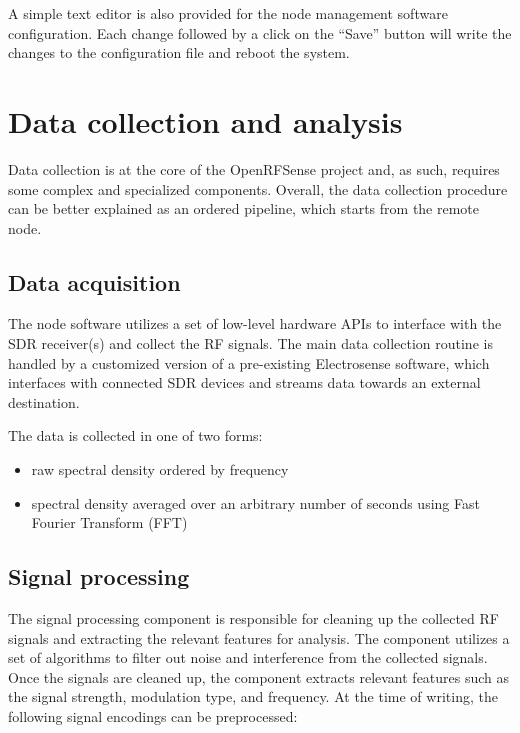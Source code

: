 \documentclass[
  letterpaper,
  a4paper,
  12pt,
  titlepage,
  oneside,
  openany]{book}
\providecommand{\tightlist}{%
  \setlength{\itemsep}{0pt}\setlength{\parskip}{0pt}}\usepackage{longtable,booktabs,array}
\begin{document}
A simple text editor is also provided for the node management software
configuration. Each change followed by a click on the \enquote{Save}
button will write the changes to the configuration file and reboot the
system.

\newpage{}


\hypertarget{data-collection-and-analysis}{%
\chapter{Data collection and
analysis}\label{data-collection-and-analysis}}

Data collection is at the core of the OpenRFSense project and, as such,
requires some complex and specialized components. Overall, the data
collection procedure can be better explained as an ordered pipeline,
which starts from the remote node.

\hypertarget{data-acquisition}{%
\section{Data acquisition}\label{data-acquisition}}

The node software utilizes a set of low-level hardware APIs to interface
with the SDR receiver(s) and collect the RF signals. The main data
collection routine is handled by a customized version of a pre-existing
Electrosense software, which interfaces with connected SDR devices and
streams data towards an external destination.

The data is collected in one of two forms:

\begin{itemize}
\tightlist
\item
  raw spectral density ordered by frequency
\item
  spectral density averaged over an arbitrary number of seconds using
  Fast Fourier Transform (FFT)
\end{itemize}

\hypertarget{sec-signalProcessing}{%
\section{Signal processing}\label{sec-signalProcessing}}

The signal processing component is responsible for cleaning up the
collected RF signals and extracting the relevant features for analysis.
The component utilizes a set of algorithms to filter out noise and
interference from the collected signals. Once the signals are cleaned
up, the component extracts relevant features such as the signal
strength, modulation type, and frequency. At the time of writing, the
following signal encodings can be preprocessed:
\end{document}
